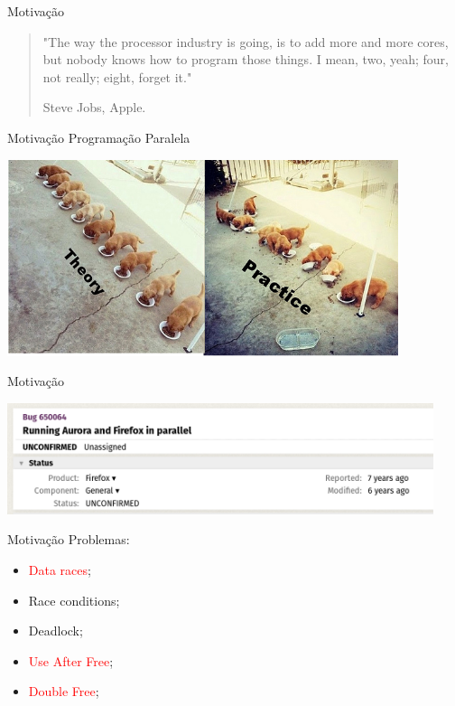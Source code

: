 \documentclass[aspectratio=169]{beamer}
\begin{document}
\begin{frame}{Motivação}
	\begin{quote}
		"The way the processor industry is going, is to add more and more cores, but nobody knows how to program those things. I mean, two, yeah; four, not really; eight, forget it."
		
		\hspace{8.2cm}Steve Jobs, Apple.
	\end{quote}
\end{frame}

\begin{frame}{Motivação}
	Programação Paralela
	\begin{center}
		\includegraphics[width=11.5cm]{imgs/meme.png}
	\end{center}
\end{frame}

\begin{frame}{Motivação}
	\begin{center}
		\includegraphics[width=12.5cm]{imgs/bug.png}
	\end{center}
\end{frame}

\begin{frame}{Motivação}
	Problemas:
	\begin{itemize}
		\item \textcolor{red}{Data races};
		\item Race conditions;
		\item Deadlock;
		\item \textcolor{red}{Use After Free};
		\item \textcolor{red}{Double Free};
	\end{itemize}
\end{frame}
\end{document}
